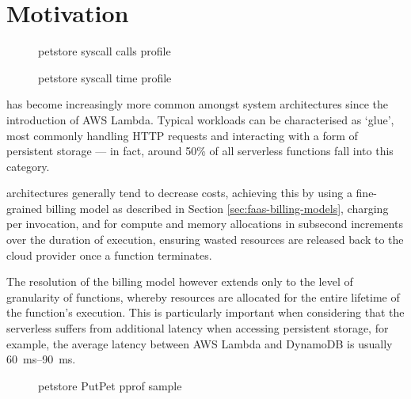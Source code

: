 \section{Motivation}
\begin{figure}
    \begin{center}
        
    \end{center}
    \caption{\faas{} petstore syscall calls profile}
\end{figure}

\begin{figure}
    \begin{center}
        
    \end{center}
    \caption{\faas{} petstore syscall time profile}
\end{figure}

\faaslong{} has become increasingly more common amongst system architectures since the introduction of AWS Lambda\cite{amazonAWSLambda2024}. Typical \faas{} workloads can be characterised as `glue', most commonly handling HTTP requests and interacting with a form of persistent storage --- in fact, around 50\% of all serverless functions fall into this category\cite{eismannReviewServerlessUse2020}.

\faas{} architectures generally tend to decrease costs, achieving this by using a fine-grained billing model as described in Section \ref{sec:faas-billing-models}, charging per invocation, and for compute and memory allocations in subsecond increments over the duration of execution, ensuring wasted resources are released back to the cloud provider once a function terminates.

The resolution of the billing model however extends only to the level of granularity of functions, whereby resources are allocated for the entire lifetime of the function's execution. This is particularly important when considering that the serverless suffers from additional latency when accessing persistent storage, for example, the average latency between AWS Lambda and DynamoDB is usually \qtyrange{60}{90}{\ms}\cite{ghoshCachingTechniquesImprove2020}.

\begin{figure*}
    \begin{center}
        \begin{tikzpicture}[scale = 0.75, every node/.style={scale=0.75}]
            
        \end{tikzpicture}
    \end{center}
    \caption{\faas{} petstore PutPet pprof sample}
\end{figure*}

